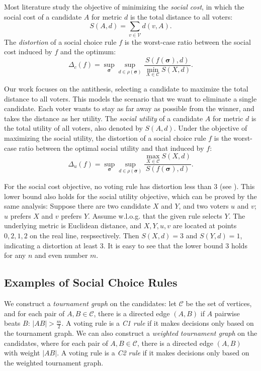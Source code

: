 \documentclass[11pt]{article}
\theoremstyle{remark}
\begin{document}
Most literature study the objective of minimizing the \emph{social cost},  %
in which the social cost of a candidate $A$ for metric $d$ is the total distance to all voters:
$$ S(A,d)=\sum_{v\in \mathcal V}d(v,A).$$
The \emph{distortion} of a social choice rule $f$ is the worst-case ratio between the social cost induced by $f$ and the optimum:
$$ \Delta_c(f)= \sup_{\bm{\sigma}}\sup_{d\in \rho(\bm{\sigma})} \frac{S(f(\bm{\sigma}),d)}{\min_{X\in \mathcal C}S(X,d)}.$$

Our work focuses on the antithesis, selecting a candidate to maximize the total distance to all voters. This models the scenario that we want to eliminate a single candidate. Each voter wants to stay as far away as possible from the winner, and takes the distance as her utility. The \emph{social utility} of a candidate $A$ for metric $d$ is the total utility of all voters, also denoted by $S(A,d)$. Under the objective of maximizing the social utility,
the distortion of a social choice rule $f$ is the worst-case ratio between the optimal social utility and that induced by $f$:
$$ \Delta_u(f)= \sup_{\bm{\sigma}}\sup_{d\in \rho(\bm{\sigma})} \frac{\max_{X\in \mathcal C}S(X,d)}{S(f(\bm{\sigma}),d)}.$$

For the social cost objective, no voting rule has distortion less than 3 (see \cite{anshelevich2015approximating}). This lower bound also holds for the social utility objective, which can be proved by the same analysis: Suppose there are two candidate $X$ and $Y$, and two voters $u$ and $v$; $u$ prefers $X$ and $v$ prefers $Y$. Assume w.l.o.g. that the given rule selects $Y$. The underlying metric is Euclidean distance, and $X,Y,u,v$ are located at points $0,2,1,2$ on the real line, respsectively. Then $S(X,d)=3$ and $S(Y,d)=1$, indicating a distortion at least 3. It is easy to see that the lower bound 3 holds for any $n$ and even number $m$.

\subsection{Examples of Social Choice Rules}
We construct a \emph{tournament graph} on the candidates: let $\mathcal C$ be the set of vertices, and for each pair of $A,B\in\mathcal C$, there is a directed edge $(A,B)$ if $A$ pairwise beats $B$: $|AB|>\frac m2$. A voting rule is a \emph{C1 rule} if it makes decisions only based on the tournament graph. We can also construct a \emph{weighted tournament graph} on the candidates, where for each pair of $A,B\in\mathcal C$, there is a directed edge $(A,B)$ with weight $|AB|$.  A voting rule is a \emph{C2 rule} if it makes decisions only based on the weighted tournament graph.
\end{document}
